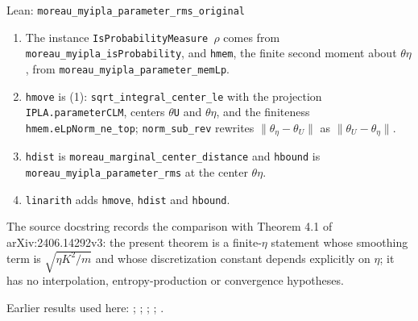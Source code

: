 \documentclass[11pt,a4paper]{article}
\begin{document}
\begin{leanbox}{Lean: \texttt{moreau\_\allowbreak{}myipla\_\allowbreak{}parameter\_\allowbreak{}rms\_\allowbreak{}original}}
\begin{enumerate}


\item The instance \texttt{Is\allowbreak{}Probability\allowbreak{}Measure \ensuremath{\rho}} comes from \texttt{moreau\_\allowbreak{}myipla\_\allowbreak{}is\allowbreak{}Probability}, and \texttt{hmem}, the finite second moment about \texttt{\ensuremath{\theta}\ensuremath{\eta}}, from \texttt{moreau\_\allowbreak{}myipla\_\allowbreak{}parameter\_\allowbreak{}mem\allowbreak{}Lp}.

\item \texttt{hmove} is (1): \texttt{sqrt\_\allowbreak{}integral\_\allowbreak{}center\_\allowbreak{}le} with the projection \texttt{IPLA.\allowbreak{}parameter\allowbreak{}CLM}, centers \texttt{\ensuremath{\theta}\allowbreak{}U} and \texttt{\ensuremath{\theta}\ensuremath{\eta}}, and the finiteness \texttt{hmem.\allowbreak{}e\allowbreak{}Lp\allowbreak{}Norm\_\allowbreak{}ne\_\allowbreak{}top}; \texttt{norm\_\allowbreak{}sub\_\allowbreak{}rev} rewrites \(\|\theta_\eta-\theta_U\|\) as \(\|\theta_U-\theta_\eta\|\).

\item \texttt{hdist} is \texttt{moreau\_\allowbreak{}marginal\_\allowbreak{}center\_\allowbreak{}distance} and \texttt{hbound} is \texttt{moreau\_\allowbreak{}myipla\_\allowbreak{}parameter\_\allowbreak{}rms} at the center \texttt{\ensuremath{\theta}\ensuremath{\eta}}.

\item \texttt{linarith} adds \texttt{hmove}, \texttt{hdist} and \texttt{hbound}.

\end{enumerate}



The source docstring records the comparison with Theorem 4.1 of arXiv:2406.14292v3: the present theorem is a finite-\(\eta\) statement whose smoothing term is \(\sqrt{\eta K^2/m}\) and whose discretization constant depends explicitly on \(\eta\); it has no interpolation, entropy-production or convergence hypotheses.
\end{leanbox}


Earlier results used here: \cite[Section~3.17.4]{LangevinLean2026ULASC}; \cite[Section~3.1.1]{LangevinLean2026IPLA}; \cite[Section~3.1.6]{LangevinLean2026IPLA}; \cite[Section~3.3.1]{LangevinLean2026IPLA}; \cite[Section~3.3.2]{LangevinLean2026IPLA}.
\end{document}
